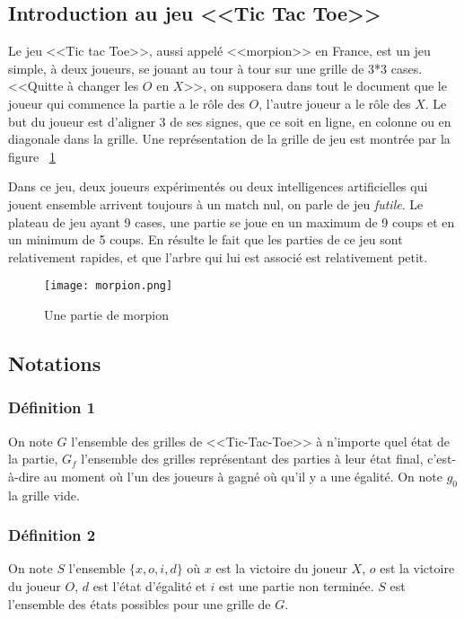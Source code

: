 \documentclass{article}
\begin{document}
\subsection{Introduction au jeu <<Tic Tac Toe>>}

Le jeu <<Tic tac Toe>>, aussi appelé <<morpion>> en France, est un jeu simple, à deux joueurs, se jouant au tour à tour sur une grille de 3*3 cases.
<<Quitte à changer les $O$ en $X$>>, on supposera dans tout le document que le joueur qui commence la partie a le rôle des $O$, l'autre joueur a le rôle des $X$.
Le but du joueur est d'aligner 3 de ses signes, que ce soit en ligne, en colonne ou en diagonale dans la grille. 
Une représentation de la grille de jeu est montrée par la figure ~\ref{grille}

Dans ce jeu, deux joueurs expérimentés ou deux intelligences artificielles qui jouent ensemble arrivent toujours à un match
nul, on parle de jeu \emph{futile}. Le plateau de jeu ayant 9 cases, une partie se joue en un maximum de 9 coups et en un minimum de 5 coups.
En résulte le fait que les parties de ce jeu sont relativement rapides, et que l'arbre qui lui est associé est relativement petit.

\begin{figure}[!h]
\centering
\texttt{[image: morpion.png]}
\caption{Une partie de morpion}
\label{grille}
\end{figure}

\subsection{Notations}


\subsubsection{Définition 1}
On note $G$ l'ensemble des grilles de <<Tic-Tac-Toe>> à n'importe quel état de la partie, $G_{f}$ l'ensemble des grilles représentant des parties à leur état final, c'est-à-dire au moment où l'un des joueurs à gagné où qu'il y a une égalité. On note $g_{0}$ la grille vide.

\subsubsection{Définition 2}
On note $S$ l'ensemble $\{x,o,i,d\}$ où $x$ est la victoire du joueur $X$, $o$ est la victoire du joueur $O$, $d$ est l'état d'égalité et $i$ est une partie non terminée. $S$ est l'ensemble des états possibles pour une grille de $G$.
\end{document}
